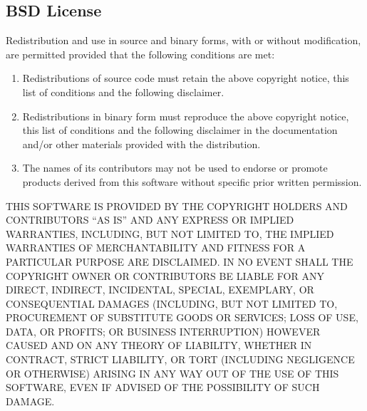 \begin{small}
\subsection{BSD License}

Redistribution and use in source and binary forms, with or without
modification, are permitted provided that the following conditions
are met:

\begin{enumerate}[1.]
\item
Redistributions of source code must retain the above copyright
notice, this list of conditions and the following disclaimer.
\item
Redistributions in binary form must reproduce the above copyright
notice, this list of conditions and the following disclaimer in the
documentation and/or other materials provided with the distribution.
\item
The names of its contributors may not be used to endorse or promote 
products derived from this software without specific prior written 
permission.
\end{enumerate}

\noindent
THIS SOFTWARE IS PROVIDED BY THE COPYRIGHT HOLDERS AND CONTRIBUTORS
``AS IS'' AND ANY EXPRESS OR IMPLIED WARRANTIES, INCLUDING, BUT NOT
LIMITED TO, THE IMPLIED WARRANTIES OF MERCHANTABILITY AND FITNESS FOR
A PARTICULAR PURPOSE ARE DISCLAIMED.  IN NO EVENT SHALL THE COPYRIGHT
OWNER OR CONTRIBUTORS BE LIABLE FOR ANY DIRECT, INDIRECT, INCIDENTAL, SPECIAL,
EXEMPLARY, OR CONSEQUENTIAL DAMAGES (INCLUDING, BUT NOT LIMITED TO,
PROCUREMENT OF SUBSTITUTE GOODS OR SERVICES; LOSS OF USE, DATA, OR
PROFITS; OR BUSINESS INTERRUPTION) HOWEVER \mbox{} CAUSED AND ON ANY THEORY OF
LIABILITY, WHETHER IN CONTRACT, STRICT LIABILITY, OR TORT (INCLUDING
NEGLIGENCE OR OTHERWISE) ARISING IN ANY WAY OUT OF THE USE OF THIS
SOFTWARE, EVEN IF ADVISED OF THE POSSIBILITY OF SUCH DAMAGE.

\end{small}
